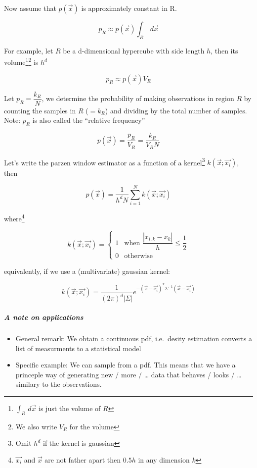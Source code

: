 Now assume that $p(\vec{x})$ is approximately constant in R.

\begin{equation*}
  p_R \approx p(\vec{x}) \int_R \,d\vec{x}
\end{equation*}

For example, let $R$ be a d-dimensional hypercube with side length $h$, then its volume\footnote{$\int_R \,d\vec{x}$ is just the volume of $R$}\footnote{We also write $V_R$ for the volume} is $h^d$

\begin{equation*}
  p_R \approx p(\vec{x}) V_R
\end{equation*}

Let $p_R = \dfrac{k_R}{N}$, we determine the probability of making observations in region $R$ by counting the samples in $R$ ($=k_R$) and dividing by the total number of samples. Note: $p_R$ is also called the ``relative frequency''

\begin{equation*}
  p(\vec{x}) = \dfrac{p_R}{V_R} = \dfrac{k_R}{V_R N}
\end{equation*}

Let's write the parzen window estimator as a function of a kernel\footnote{Omit $h^d$ if the kernel is gaussian} $k(\vec{x}; \vec{x_i})$, then

\begin{equation*}
  p(\vec{x}) = \dfrac{1}{h^d N} \sum_{i=1}^N k(\vec{x}; \vec{x_i})
\end{equation*}

where\footnote{$\vec{x_i}$ and $\vec{x}$ are not father apart then $0.5 h$ in any dimension $k$}

\begin{equation*}
  k(\vec{x}; \vec{x_i}) = \begin{cases}
    1 &\text{when } \dfrac{|x_{i,k} - x_k|}{h} \le \dfrac{1}{2}\\
    0 &\text{otherwise}
  \end{cases}
\end{equation*}

equivalently, if we use a (multivariate) gaussian kernel:


\begin{equation*}
   k(\vec{x}; \vec{x_i}) = \dfrac{1}{{(2\pi)}^d |\Sigma|} e^{-{(\vec{x} - \vec{x_i})}^T \Sigma^{-1}(\vec{x}-\vec{x_i})}
\end{equation*}

\subparagraph{A note on applications}
\begin{itemize}
  \item General remark: We obtain a continuous pdf, i.e.\ desity estimation converts a list of measurments to a statistical model
  \item Specific example: We can sample from a pdf. This means that we have a princeple way of generating new / more / \ldots{} data that behaves / looks / \ldots{} similary to the observations.
\end{itemize}

